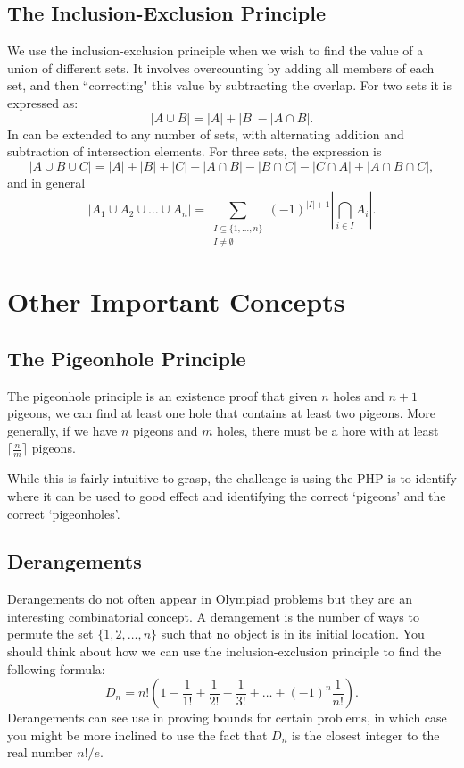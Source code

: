 \documentclass[12pt]{article}
\begin{document}
\subsection{The Inclusion-Exclusion Principle}
We use the inclusion-exclusion principle when we wish to find the value of a union of different sets. It involves overcounting by adding all members of each set, and then ``correcting" this value by subtracting the overlap. For two sets it is expressed as: \[|A\cup B|=|A|+|B|-|A\cap B|.\] In can be extended to any number of sets, with alternating addition and subtraction of intersection elements. For three sets, the expression is \[|A\cup B\cup C|=|A|+|B|+|C|-|A\cap B|-|B\cap C|-|C\cap A|+|A\cap B\cap C|,\] and in general \[\left|A_1\cup A_2\cup \dots\cup A_n\right|=\sum_{\substack{I\subseteq \{1,\dots,n\} \\ I\neq \emptyset}}(-1)^{|I|+1}\left|\bigcap_{i\in I}A_i\right|.\]
\section{Other Important Concepts}
\subsection{The Pigeonhole Principle}
The pigeonhole principle is an existence proof that given $n$ holes and $n+1$ pigeons, we can find at least one hole that contains at least two pigeons. More generally, if we have $n$ pigeons and $m$ holes, there must be a hore with at least $\lceil \frac{n}{m}\rceil$ pigeons.

\vspace{2mm}

\noindent While this is fairly intuitive to grasp, the challenge is using the PHP is to identify where it can be used to good effect and identifying the correct `pigeons' and the correct `pigeonholes'.
\subsection{Derangements}
Derangements do not often appear in Olympiad problems but they are an interesting combinatorial concept. A derangement is the number of ways to permute the set $\{1,2,\dots,n\}$ such that no object is in its initial location. You should think about how we can use the inclusion-exclusion principle to find the following formula: \[D_n=n!\left(1-
\frac{1}{1!}+\frac{1}{2!}-\frac{1}{3!}+\dots+(-1)^n\frac{1}{n!}\right).\] Derangements can see use in proving bounds for certain problems, in which case you might be more inclined to use the fact that $D_n$ is the closest integer to the real number $n!/e$.
\end{document}
